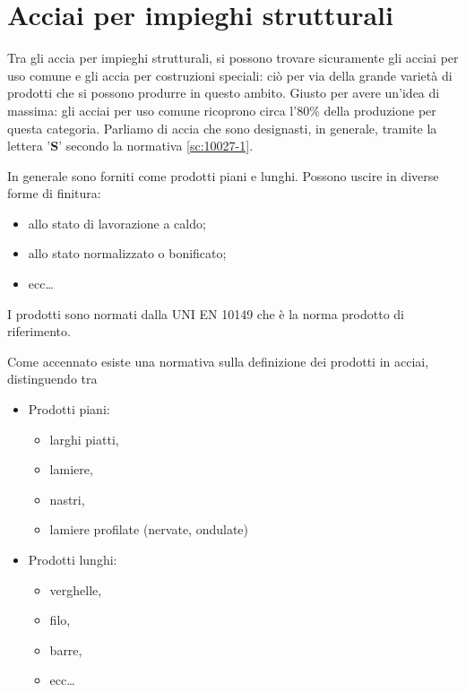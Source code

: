 \chapter{Acciai per impieghi strutturali}\label{chp:AcciaiStrutturali}
Tra gli accia per impieghi strutturali, si possono trovare sicuramente gli acciai per uso comune e gli accia per costruzioni speciali: ciò per via della grande varietà di prodotti che si possono produrre in questo ambito.
Giusto per avere un'idea di massima: gli acciai per uso comune ricoprono circa l'80\% della produzione per questa categoria.
Parliamo di accia che sono designasti, in generale, tramite la lettera '\textbf{S}' secondo la normativa \ref{sc:10027-1}.

In generale sono forniti come prodotti piani e lunghi. Possono uscire in diverse forme di finitura:
\begin{itemize}
\item allo stato di lavorazione a caldo;
\item allo stato normalizzato o bonificato;
\item ecc\dots
\end{itemize}
I prodotti sono normati dalla UNI EN 10149 che è la norma prodotto di riferimento.

Come accennato esiste una normativa sulla definizione dei prodotti in acciai, distinguendo tra
\begin{itemize}
\item Prodotti piani:
	\begin{itemize}
	\item larghi piatti,
	\item lamiere,
	\item nastri,
	\item lamiere profilate (nervate, ondulate)
	\end{itemize}
\item Prodotti lunghi:
	\begin{itemize}
	\item verghelle,
	\item filo,
	\item barre,
	\item ecc\dots
	\end{itemize}
\end{itemize}

